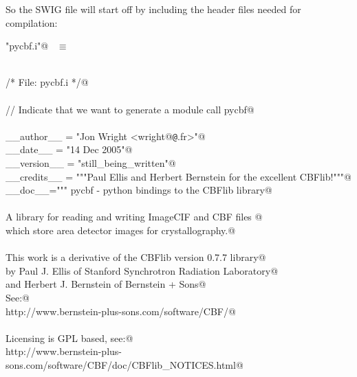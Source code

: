 \documentclass[10pt,a4paper,twoside,notitlepage]{article}
\begin{document}
So the SWIG file will start off by including the header files needed
for compilation:


\begin{flushleft} \small \label{scrap1}
\verb@"pycbf.i"@\nobreak\ {\footnotesize {} }$\equiv$
\vspace{-1ex}
\begin{list}{}{} \item
\mbox{}\verb@@\\
\mbox{}\verb@/* File: pycbf.i */@\\
\mbox{}\verb@@\\
\mbox{}\verb@// Indicate that we want to generate a module call pycbf@\\
\mbox{}\verb@%module pycbf@\\
\mbox{}\verb@@\\
\mbox{}\verb@%pythoncode %{@\\
\mbox{}\verb@__author__ = "Jon Wright <wright@{\tt @}\verb@esrf.fr>"@\\
\mbox{}\verb@__date__ = "14 Dec 2005"@\\
\mbox{}\verb@__version__ = "still_being_written"@\\
\mbox{}\verb@__credits__ = """Paul Ellis and Herbert Bernstein for the excellent CBFlib!"""@\\
\mbox{}\verb@__doc__=""" pycbf - python bindings to the CBFlib library@\\
\mbox{}\verb@@\\
\mbox{}\verb@ A library for reading and writing ImageCIF and CBF files @\\
\mbox{}\verb@ which store area detector images for crystallography.@\\
\mbox{}\verb@@\\
\mbox{}\verb@ This work is a derivative of the CBFlib version 0.7.7 library@\\
\mbox{}\verb@ by  Paul J. Ellis of Stanford Synchrotron Radiation Laboratory@\\
\mbox{}\verb@ and Herbert J. Bernstein of Bernstein + Sons@\\
\mbox{}\verb@ See:@\\
\mbox{}\verb@   http://www.bernstein-plus-sons.com/software/CBF/@\\
\mbox{}\verb@@\\
\mbox{}\verb@ Licensing is GPL based, see:@\\
\mbox{}\verb@   http://www.bernstein-plus-sons.com/software/CBF/doc/CBFlib_NOTICES.html@\\
\mbox{}\verb@@\\

\end{list}
\end{flushleft}
\end{document}
